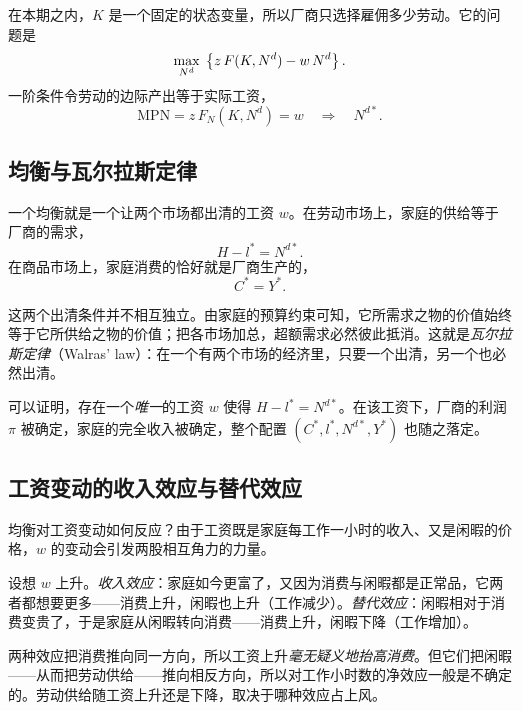 在本期之内，$K$ 是一个固定的状态变量，所以厂商只选择雇佣多少劳动。它的问题是
\[
\max_{N^d}\; \left\{ z\,F(K, N^d) - w\,N^d \right\}.
\]
一阶条件令劳动的边际产出等于实际工资，
\[
\mathrm{MPN} = z\,F_N(K, N^d) = w \quad\Longrightarrow\quad N^{d*}.
\]


\subsection{均衡与瓦尔拉斯定律}

一个均衡就是一个让两个市场都出清的工资 $w$。在劳动市场上，家庭的供给等于厂商的需求，
\[
H - l^* = N^{d*}.
\]
在商品市场上，家庭消费的恰好就是厂商生产的，
\[
C^* = Y^*.
\]

这两个出清条件并不相互独立。由家庭的预算约束可知，它所需求之物的价值始终等于它所供给之物的价值；把各市场加总，超额需求必然彼此抵消。这就是\emph{瓦尔拉斯定律}（Walras' law）：在一个有两个市场的经济里，只要一个出清，另一个也必然出清。


可以证明，存在一个\emph{唯一}的工资 $w$ 使得 $H - l^* = N^{d*}$。在该工资下，厂商的利润 $\pi$ 被确定，家庭的完全收入被确定，整个配置 $(C^*, l^*, N^{d*}, Y^*)$ 也随之落定。

\subsection{工资变动的收入效应与替代效应}

均衡对工资变动如何反应？由于工资既是家庭每工作一小时的收入、又是闲暇的价格，$w$ 的变动会引发两股相互角力的力量。

设想 $w$ 上升。\emph{收入效应}：家庭如今更富了，又因为消费与闲暇都是正常品，它两者都想要更多——消费上升，闲暇也上升（工作减少）。\emph{替代效应}：闲暇相对于消费变贵了，于是家庭从闲暇转向消费——消费上升，闲暇下降（工作增加）。

两种效应把消费推向同一方向，所以工资上升\emph{毫无疑义地抬高消费}。但它们把闲暇——从而把劳动供给——推向相反方向，所以对工作小时数的净效应一般是不确定的。劳动供给随工资上升还是下降，取决于哪种效应占上风。

